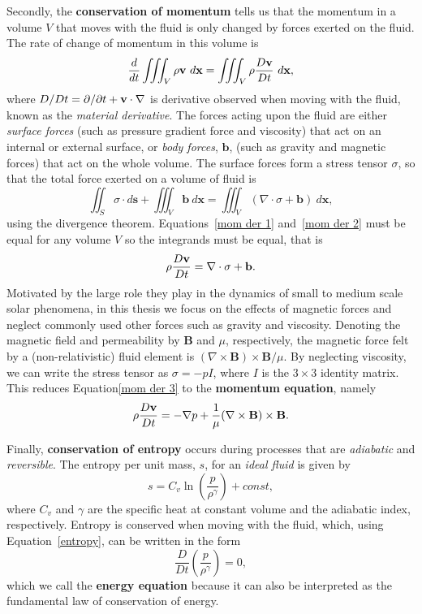 \documentclass[12pt]{../style-files/ociamthesis}
\begin{document}
Secondly, the \textbf{conservation of momentum} tells us that the momentum in a volume $V$ that moves with the fluid is only changed by forces exerted on the fluid. The rate of change of momentum in this volume is
\begin{equation}
	\frac{d}{dt} \iiint_V \rho\mathbf{v} ~d\mathbf{x} = \iiint_V \rho\frac{D\mathbf{v}}{Dt} ~d\mathbf{x}, \label{mom der 1}
\end{equation}
where $D/Dt = \partial/\partial t + \mathbf{v}\cdot\nabla$ is derivative observed when moving with the fluid, known as the \textit{material derivative}. The forces acting upon the fluid are either \textit{surface forces} (such as pressure gradient force and viscosity) that act on an internal or external surface, or \textit{body forces}, $\mathbf{b}$, (such as gravity and magnetic forces) that act on the whole volume. The surface forces form a stress tensor $\sigma$, so that the total force exerted on a volume of fluid is
\begin{equation}
	\iint_S \sigma\cdot d\mathbf{s} + \iiint_V \mathbf{b} ~d\mathbf{x} = \iiint_V (\nabla\cdot \sigma + \mathbf{b}) ~d\mathbf{x}, \label{mom der 2}
\end{equation}
using the divergence theorem. Equations~\eqref{mom der 1} and~\eqref{mom der 2} must be equal for any volume $V$ so the integrands must be equal, that is
\begin{equation}
\rho\frac{D\mathbf{v}}{Dt} = \nabla\cdot \sigma + \mathbf{b}. \label{mom der 3}
\end{equation}
Motivated by the large role they play in the dynamics of small to medium scale solar phenomena, in this thesis we focus on the effects of magnetic forces and neglect commonly used other forces such as gravity and viscosity. Denoting the magnetic field and permeability by $\mathbf{B}$ and $\mu$, respectively, the magnetic force felt by a (non-relativistic) fluid element is $(\nabla\times\mathbf{B})\times\mathbf{B}/\mu$. By neglecting viscosity, we can write the stress tensor as $\sigma = -pI$, where $I$ is the $3\times3$ identity matrix. This reduces Equation\eqref{mom der 3} to the \textbf{momentum equation}, namely
\begin{equation}
\rho\frac{D\mathbf{v}}{Dt} = -\nabla p + \frac{1}{\mu}(\nabla\times\mathbf{B})\times\mathbf{B}. \label{mom eqn}
\end{equation}

Finally, \textbf{conservation of entropy} occurs during processes that are \textit{adiabatic} and \textit{reversible}. The entropy per unit mass, $s$, for an \textit{ideal fluid} is given by
\begin{equation}
	s = C_v\ln\left(\frac{p}{\rho^\gamma}\right) + const, \label{entropy}
\end{equation}
where $C_v$ and $\gamma$ are the specific heat at constant volume and the adiabatic index, respectively. Entropy is conserved when moving with the fluid, which, using Equation~\eqref{entropy}, can be written in the form
\begin{equation}
\frac{D}{Dt}\left(\frac{p}{\rho^\gamma}\right) = 0, \label{energy eqn}
\end{equation}
which we call the \textbf{energy equation} because it can also be interpreted as the fundamental law of conservation of energy.
\end{document}
